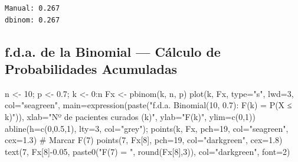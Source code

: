 \documentclass[
  letterpaper,
  DIV=11,
  numbers=noendperiod]{scrartcl}
\newenvironment{Shaded}{\begin{snugshade}}{\end{snugshade}}
\newcommand{\AttributeTok}[1]{\textcolor[rgb]{0.40,0.45,0.13}{#1}}
\newcommand{\CommentTok}[1]{\textcolor[rgb]{0.37,0.37,0.37}{#1}}
\newcommand{\DecValTok}[1]{\textcolor[rgb]{0.68,0.00,0.00}{#1}}
\newcommand{\FloatTok}[1]{\textcolor[rgb]{0.68,0.00,0.00}{#1}}
\newcommand{\FunctionTok}[1]{\textcolor[rgb]{0.28,0.35,0.67}{#1}}
\newcommand{\NormalTok}[1]{\textcolor[rgb]{0.00,0.23,0.31}{#1}}
\newcommand{\OtherTok}[1]{\textcolor[rgb]{0.00,0.23,0.31}{#1}}
\newcommand{\SpecialCharTok}[1]{\textcolor[rgb]{0.37,0.37,0.37}{#1}}
\newcommand{\StringTok}[1]{\textcolor[rgb]{0.13,0.47,0.30}{#1}}
\begin{document}
\begin{verbatim}
Manual: 0.267 
dbinom: 0.267
\end{verbatim}

\subsection{f.d.a. de la Binomial --- Cálculo de Probabilidades
Acumuladas}\label{f.d.a.-de-la-binomial-calculo-de-probabilidades-acumuladas}

\begin{Shaded}
\begin{Highlighting}[]
\NormalTok{n }\OtherTok{\textless{}{-}} \DecValTok{10}\NormalTok{; p }\OtherTok{\textless{}{-}} \FloatTok{0.7}\NormalTok{; k }\OtherTok{\textless{}{-}} \DecValTok{0}\SpecialCharTok{:}\NormalTok{n}
\NormalTok{Fx }\OtherTok{\textless{}{-}} \FunctionTok{pbinom}\NormalTok{(k, n, p)}
\FunctionTok{plot}\NormalTok{(k, Fx, }\AttributeTok{type=}\StringTok{"s"}\NormalTok{, }\AttributeTok{lwd=}\DecValTok{3}\NormalTok{, }\AttributeTok{col=}\StringTok{"seagreen"}\NormalTok{,}
     \AttributeTok{main=}\FunctionTok{expression}\NormalTok{(}\FunctionTok{paste}\NormalTok{(}\StringTok{"f.d.a. Binomial(10, 0.7): F(k) = P(X ≤ k)"}\NormalTok{)),}
     \AttributeTok{xlab=}\StringTok{"Nº de pacientes curados (k)"}\NormalTok{, }\AttributeTok{ylab=}\StringTok{"F(k)"}\NormalTok{, }\AttributeTok{ylim=}\FunctionTok{c}\NormalTok{(}\DecValTok{0}\NormalTok{,}\DecValTok{1}\NormalTok{))}
\FunctionTok{abline}\NormalTok{(}\AttributeTok{h=}\FunctionTok{c}\NormalTok{(}\DecValTok{0}\NormalTok{,}\FloatTok{0.5}\NormalTok{,}\DecValTok{1}\NormalTok{), }\AttributeTok{lty=}\DecValTok{3}\NormalTok{, }\AttributeTok{col=}\StringTok{"grey"}\NormalTok{); }\FunctionTok{points}\NormalTok{(k, Fx, }\AttributeTok{pch=}\DecValTok{19}\NormalTok{, }\AttributeTok{col=}\StringTok{"seagreen"}\NormalTok{, }\AttributeTok{cex=}\FloatTok{1.3}\NormalTok{)}
\CommentTok{\# Marcar F(7)}
\FunctionTok{points}\NormalTok{(}\DecValTok{7}\NormalTok{, Fx[}\DecValTok{8}\NormalTok{], }\AttributeTok{pch=}\DecValTok{19}\NormalTok{, }\AttributeTok{col=}\StringTok{"darkgreen"}\NormalTok{, }\AttributeTok{cex=}\FloatTok{1.8}\NormalTok{)}
\FunctionTok{text}\NormalTok{(}\DecValTok{7}\NormalTok{, Fx[}\DecValTok{8}\NormalTok{]}\SpecialCharTok{{-}}\FloatTok{0.05}\NormalTok{, }\FunctionTok{paste0}\NormalTok{(}\StringTok{"F(7) = "}\NormalTok{, }\FunctionTok{round}\NormalTok{(Fx[}\DecValTok{8}\NormalTok{],}\DecValTok{3}\NormalTok{)), }\AttributeTok{col=}\StringTok{"darkgreen"}\NormalTok{, }\AttributeTok{font=}\DecValTok{2}\NormalTok{)}
\end{Highlighting}
\end{Shaded}
\end{document}
